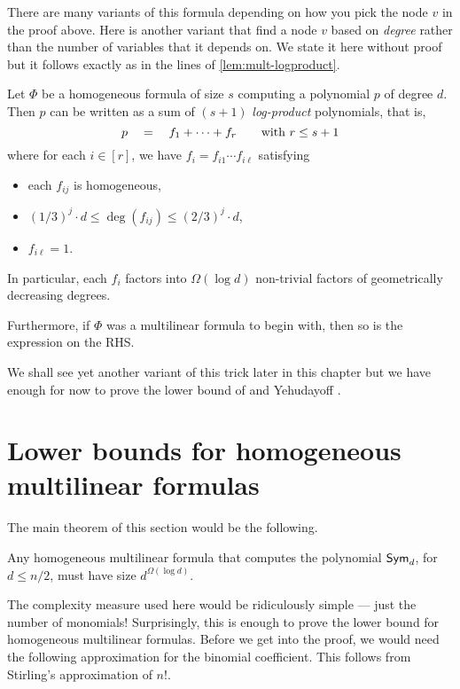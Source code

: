 There are many variants of this formula depending on how you pick the node $v$ in the proof above.
Here is another variant that find a node $v$ based on \emph{degree} rather than the number of variables that it depends on.
We state it here without proof but it follows exactly as in the lines of \autoref{lem:mult-logproduct}.

\begin{lemma}\label{lem:hom-logproduct}
  Let $\Phi$ be a homogeneous formula of size $s$ computing a polynomial $p$ of degree $d$.
Then $p$ can be written as a sum of $(s+1)$ \emph{log-product} polynomials, that is,
\[
p \quad = \quad f_1 + \cdots + f_{r}\quad\quad \text{with $r \leq s+1$}
\]
where for each $i \in [r]$, we have $f_i = f_{i1} \cdots f_{i\ell}$ satisfying
\begin{itemize}
\item each $f_{ij}$ is homogeneous,
\item $(1 / 3)^j \cdot d \leq \deg(f_{ij}) \leq (2/ 3)^j \cdot d$,
\item $f_{i\ell} = 1$.
\end{itemize}
In particular, each $f_i$ factors into $\Omega(\log d)$ non-trivial factors of geometrically decreasing degrees. 

Furthermore, if $\Phi$ was a multilinear formula to begin with, then so is the expression on the RHS. 
\end{lemma}


We shall see yet another variant of this trick later in this chapter but we have enough for now to prove the lower bound of \Hrubes and Yehudayoff \cite{HY11a}. 

\section{Lower bounds for homogeneous multilinear formulas}

The main theorem of this section would be the following.

\begin{theorem}[\cite{HY11a}]\label{thm:Hrubes-Yehudayoff}
Any homogeneous multilinear formula that computes the polynomial $\operatorname{\mathsf{Sym}}_d$, for $d \leq n/2$, must have size $d^{\Omega(\log d)}$. 
\end{theorem}

The complexity measure used here would be ridiculously simple --- just the number of monomials!
Surprisingly, this is enough to prove the lower bound for homogeneous multilinear formulas. Before we get into the proof, we would need the following approximation for the binomial coefficient. This follows from Stirling's approximation of $n!$. 

